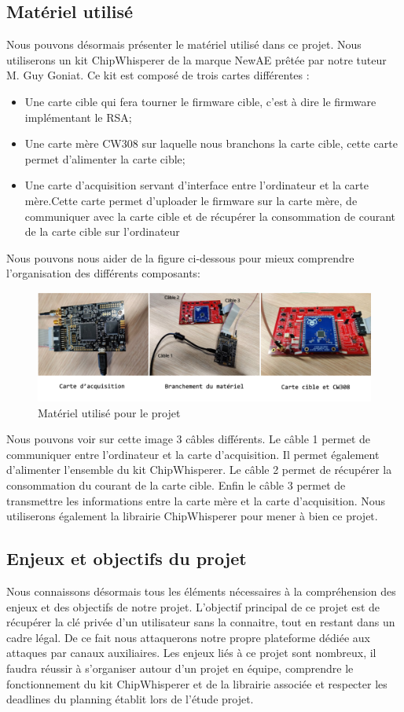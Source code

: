 \subsection{Matériel utilisé}
Nous pouvons désormais présenter le matériel utilisé dans ce projet. Nous utiliserons un kit ChipWhisperer de la marque NewAE prêtée par notre tuteur M. Guy Goniat. Ce kit est composé de trois cartes différentes :
\begin{itemize}
\item Une carte cible qui fera tourner le firmware cible, c'est à dire le firmware implémentant le RSA;
\item Une carte mère CW308 sur laquelle nous branchons la carte cible, cette carte permet d'alimenter la carte cible;
\item Une carte d’acquisition servant d'interface entre l'ordinateur et la carte mère.Cette carte permet d'uploader le firmware sur la carte mère, de communiquer avec la carte cible et de récupérer la consommation de courant de la carte cible sur l'ordinateur
\end{itemize}
\pagebreak
Nous pouvons nous aider de la figure ci-dessous pour mieux comprendre l’organisation des différents composants:
\begin{figure}[H]
    \centering
    \includegraphics[width=\textwidth]{fig/materiel.png}
    \caption{Matériel utilisé pour le projet}
    \label{fig:materiel}
\end{figure}

Nous pouvons voir sur cette image 3 câbles différents. Le câble 1 permet de communiquer entre l’ordinateur et la carte d’acquisition. Il permet également d'alimenter l'ensemble du kit ChipWhisperer. Le câble 2 permet de récupérer la consommation du courant de la carte cible. Enfin le câble 3 permet de transmettre les informations entre la carte mère et la carte d’acquisition.
Nous utiliserons également la librairie ChipWhisperer pour mener à bien ce projet.
\subsection{Enjeux et objectifs du projet}
Nous connaissons désormais tous les éléments nécessaires à la compréhension des enjeux et des objectifs de notre projet. L'objectif principal de ce projet est de récupérer la clé privée d'un utilisateur sans la connaitre, tout en restant dans un cadre légal. De ce fait nous attaquerons notre propre plateforme dédiée aux attaques par canaux auxiliaires. Les enjeux liés à ce projet sont nombreux, il faudra réussir à s’organiser autour d'un projet en équipe, comprendre le fonctionnement du kit ChipWhisperer et de la librairie associée et respecter les deadlines du planning établit lors de l'étude projet.

